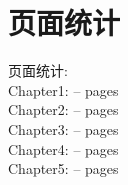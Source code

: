 \chapter*{页面统计}

页面统计:\\
Chapter1: \pageref{chapter1}--\pageref{chapter2} pages\\
Chapter2: \pageref{chapter2}--\pageref{chapter3} pages\\
Chapter3: \pageref{chapter3}--\pageref{chapter4} pages\\
Chapter4: \pageref{chapter4}--\pageref{chapter5} pages\\
Chapter5: \pageref{chapter5}--\pageref{chapter6} pages\\

